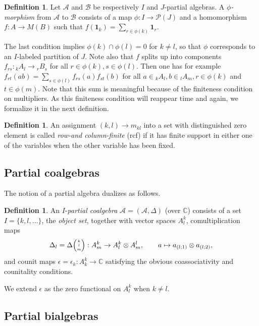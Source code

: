 \documentclass[10pt]{article}
\newcommand{\C}{\mathbb{C}}
\newcommand{\GrDA}[3]{{}_{#2}#1_{#3}} %
\newcommand{\Grtt}[4]{#1{\tiny {\begin{pmatrix} #2\\#3\\#4\end{pmatrix}}}}
\newcommand{\GrRA}[3]{#1^{#2}_{#3}} %
\newcommand{\Unit}{\mathbf{1}}
\theoremstyle{definition}
\newtheorem{Def}[Theorem]{Definition}
\numberwithin{equation}{section}
\begin{document}
\begin{Def}\label{DefMor} Let $\mathscr{A}$ and $\mathscr{B}$ be respectively $I$ and $J$-partial algebras. A \emph{$\phi$-morphism} from $\mathscr{A}$ to $\mathscr{B}$ consists of a map $\phi:I \rightarrow \mathscr{P}(J)$ and a homomorphism $f:A\rightarrow M(B)$ such that $f(\Unit_k) = \sum_{r\in \phi(k)} \Unit_r$.
\end{Def} 
The last condition implies $\phi(k)\cap \phi(l)=0$ for
$k\neq l$, so that $\phi$ corresponds to an $I$-labeled partition of $J$.
Note also that  $f$ splits up into components $f_{rs}:
\GrDA{A}{k}{l}\rightarrow \GrDA{B}{r}{s}$ for all $r\in \phi(k),s\in
\phi(l)$. Then one has for example $f_{rt}(ab) = \sum_{s\in \phi(l)}
f_{rs}(a)f_{st}(b)$ for all $a\in \GrDA{A}{k}{l}, b\in \GrDA{A}{l}{m},
r\in \phi(k)$ and $t\in \phi(m)$. Note that this sum is meaningful
because of the finiteness condition on multipliers.  
As this finiteness condition will reappear time and again, we formalize it in the next definition.
 
\begin{Def} An assignment $(k,l)\rightarrow m_{kl}$ into a set with distinguished zero element is called \emph{row-and column-finite} (rcf) if it has finite support in either one of the variables when the other variable has been fixed. 
\end{Def} 

\subsection{Partial coalgebras}

The notion of a partial algebra dualizes as follows.

\begin{Def}\label{DefCoAlg} An  $I$-\emph{partial coalgebra} $\mathscr{A}=(\mathscr{A},\Delta)$ (over $\C$) consists of a set $I=\{k,l,\ldots\}$, the \emph{object set}, together with vector spaces $\GrRA{A}{k}{l}$, comultiplication maps \[\Delta_{l} = \Grtt{\Delta}{k}{l}{m}:\GrRA{A}{k}{m}\rightarrow \GrRA{A}{k}{l}\otimes \GrRA{A}{l}{m},\qquad a \mapsto a_{(l;1)}\otimes a_{(l;2)},\] and counit maps $\epsilon =\epsilon_k:\GrRA{A}{k}{k}\rightarrow \C$ satisfying the obvious coassociativity and counitality conditions.
\end{Def}

We extend $\epsilon$ as the zero functional on $\GrRA{A}{k}{l}$ when $k\neq l$.

\subsection{Partial bialgebras}
\end{document}
